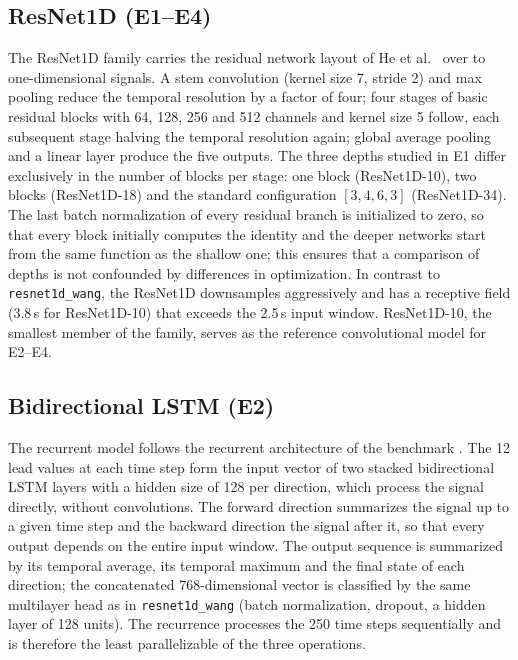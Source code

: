 \documentclass{article}
\newcommand{\wang}{\texttt{resnet1d\_wang}}
\begin{document}
\subsection{ResNet1D (E1--E4)}

The ResNet1D family carries the residual network layout of He et al.\ \citep{he2016} over to one-dimensional signals. A stem convolution (kernel size 7, stride 2) and max pooling reduce the temporal resolution by a factor of four; four stages of basic residual blocks with 64, 128, 256 and 512 channels and kernel size 5 follow, each subsequent stage halving the temporal resolution again; global average pooling and a linear layer produce the five outputs. The three depths studied in E1 differ exclusively in the number of blocks per stage: one block (ResNet1D-10), two blocks (ResNet1D-18) and the standard configuration $[3,4,6,3]$ (ResNet1D-34). The last batch normalization of every residual branch is initialized to zero, so that every block initially computes the identity and the deeper networks start from the same function as the shallow one; this ensures that a comparison of depths is not confounded by differences in optimization. In contrast to \wang{}, the ResNet1D downsamples aggressively and has a receptive field (3.8\,s for ResNet1D-10) that exceeds the 2.5\,s input window. ResNet1D-10, the smallest member of the family, serves as the reference convolutional model for E2--E4.

\subsection{Bidirectional LSTM (E2)}

The recurrent model follows the recurrent architecture of the benchmark \citep{strodthoff2021}. The 12 lead values at each time step form the input vector of two stacked bidirectional LSTM layers \citep{hochreiter1997} with a hidden size of 128 per direction, which process the signal directly, without convolutions. The forward direction summarizes the signal up to a given time step and the backward direction the signal after it, so that every output depends on the entire input window. The output sequence is summarized by its temporal average, its temporal maximum and the final state of each direction; the concatenated 768-dimensional vector is classified by the same multilayer head as in \wang{} (batch normalization, dropout, a hidden layer of 128 units). The recurrence processes the 250 time steps sequentially and is therefore the least parallelizable of the three operations.
\end{document}
